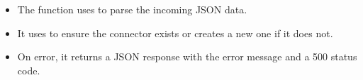 \documentclass[letterpaper,10pt,english]{sphinxmanual}
\begin{document}
\begin{fulllineitems}
\begin{description}
\begin{itemize}
\item {} 
\sphinxAtStartPar
The function uses  to parse the incoming JSON data.

\item {} 
\sphinxAtStartPar
It uses  to ensure the connector exists or creates a new one if it does not.

\item {} 
\sphinxAtStartPar
On error, it returns a JSON response with the error message and a 500 status code.

\end{itemize}

\end{description}

\end{fulllineitems}

\end{document}
